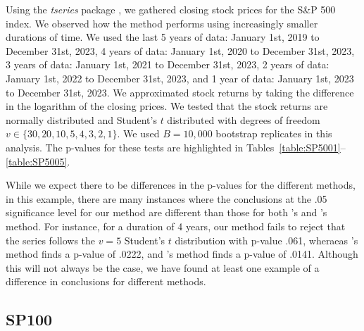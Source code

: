 \documentclass[12pt, titlepage, letterpaper]{article}
\begin{document}
{Using the \textsl{tseries} package 
\citep{tseries}, 
we gathered closing stock prices for the S\&P 500 index. We
observed how the method performs using increasingly smaller durations of
time.
We used the last 5 years of data: January 1st, 2019 to December 31st, 2023,
4 years of data: January 1st, 2020 to December 31st, 2023,
3 years of data: January 1st, 2021 to December 31st, 2023,
2 years of data: January 1st, 2022 to December 31st, 2023,
and 1 year of data: January 1st, 2023
to December 31st, 2023.
We approximated stock returns by taking the difference in the logarithm 
of the closing prices.
We tested that the stock returns are normally
distributed and Student's $t$ distributed 
with degrees of freedom $v \in \{30, 20, 10, 5, 4, 3, 2, 1\}$.
We used $B = 10,000$ bootstrap 
replicates in this analysis.
The p-values for these tests are highlighted in 
Tables~\ref{table:SP5001}--\ref{table:SP5005}. 











While we expect there to be differences in the p-values for the different 
methods, in this example, there are many instances where the conclusions
at the .05 significance level for our method are different than those
for both
\citep{babu2004goodness}'s and \citet{zeimbekakis2022misuses}'s method.
For instance, for a duration of 4 years, our method fails to reject that
the series follows the $v = 5$ Student's $t$ distribution with p-value .061,
wheraeas \citep{babu2004goodness}'s method finds a p-value of .0222, and 
\citet{zeimbekakis2022misuses}'s method finds a p-value of .0141. Although this
will not always be the case, we have found at least one example of a difference
in conclusions for different methods.

\subsection{SP100}
\label{sec:sp100}

}
\end{document}
